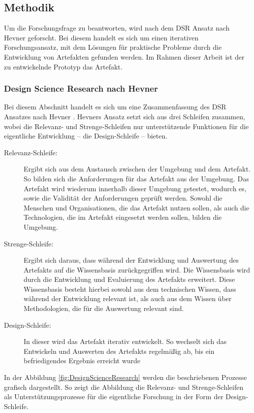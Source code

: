 \subsection{Methodik}
Um die Forschungsfrage zu beantworten, wird nach dem \ac{DSR} Ansatz nach Hevner \cite{Hevner2004} geforscht. Bei diesem handelt es sich um einen iterativen Forschungsansatz, mit dem Lösungen für praktische Probleme durch die Entwicklung von Artefakten gefunden werden. Im Rahmen dieser Arbeit ist der zu entwickelnde Prototyp das Artefakt.

\subsubsection{Design Science Research nach Hevner}
Bei diesem Abschnitt handelt es sich um eine Zusammenfassung des \ac{DSR} Ansatzes nach Hevner \cite[S.~79-81]{Hevner2004}. Hevners Ansatz setzt sich aus drei Schleifen zusammen, wobei die Relevanz- und Strenge-Schleifen nur unterstützende Funktionen für die eigentliche Entwicklung – die Design-Schleife – bieten.

\begin{description}
    \item[Relevanz-Schleife:] Ergibt sich aus dem Austausch zwischen der Umgebung und dem Artefakt. So bilden sich die Anforderungen für das Artefakt aus der Umgebung. Das Artefakt wird wiederum innerhalb dieser Umgebung getestet, wodurch es, sowie die Validität der Anforderungen geprüft werden. Sowohl die Menschen und Organisationen, die das Artefakt nutzen sollen, als auch die Technologien, die im Artefakt eingesetzt werden sollen, bilden die Umgebung.
    \item[Strenge-Schleife:] Ergibt sich daraus, dass während der Entwicklung und Auswertung des Artefakts auf die Wissensbasis zurückgegriffen wird. Die Wissensbasis wird durch die Entwicklung und Evaluierung des Artefakts erweitert. Diese Wissensbasis besteht hierbei sowohl aus dem technischen Wissen, dass während der Entwicklung relevant ist, als auch aus dem Wissen über Methodologien, die für die Auswertung relevant sind.
    \item[Design-Schleife:] In dieser wird das Artefakt iterativ entwickelt. So wechselt sich das Entwickeln und Auswerten des Artefakts regelmäßig ab, bis ein befriedigendes Ergebnis erreicht wurde
\end{description}

In der Abbildung \ref{fig:DesignScienceResearch} werden die beschriebenen Prozesse grafisch dargestellt. So zeigt die Abbildung die Relevanz- und Strenge-Schleifen als Unterstützungsprozesse für die eigentliche Forschung in der Form der Design-Schleife.

